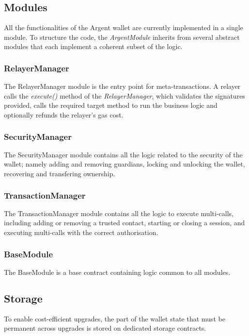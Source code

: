 \documentclass[12pt]{article}
\begin{document}
\subsection{Modules}
All the functionalities of the Argent wallet are currently implemented in a single module. To structure the code, the \emph{ArgentModule} inherits from several abstract modules that each implement a coherent subset of the logic.

\subsubsection{RelayerManager}\label{RelayerManager}

The RelayerManager module is the entry point for meta-transactions. A relayer calls the \emph{execute()} method of the \emph{RelayerManager}, which validates the signatures provided, calls the required target method to run the business logic and optionally refunds the relayer's gas cost.

\subsubsection{SecurityManager}

The SecurityManager module contains all the logic related to the security of the wallet; namely adding and removing guardians, locking and unlocking the wallet, recovering and transfering ownership.

\subsubsection{TransactionManager}

The TransactionManager module contains all the logic to execute multi-calls, including adding or removing a trusted contact, starting or closing a session, and executing multi-calls with the correct authorisation. 

\subsubsection{BaseModule}

The BaseModule is a base contract containing logic common to all modules.

\subsection{Storage}
\label{sec:storage}
To enable cost-efficient upgrades, the part of the wallet state that must be permanent across upgrades is stored on dedicated storage contracts. 
\end{document}
